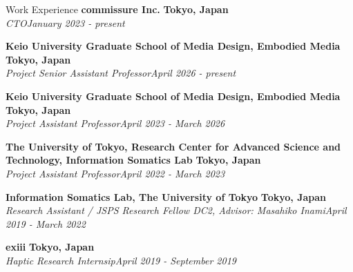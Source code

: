 \documentclass{resume} %
\begin{document}
\begin{rSection}{Work Experience}
{\bf commissure Inc.} \hfill {\bf Tokyo, Japan} 
\\{\em CTO}\hfill {\em January 2023 - present} 

{\bf Keio University Graduate School of Media Design, Embodied Media} \hfill {\bf Tokyo, Japan} 
\\{\em Project Senior Assistant Professor}\hfill {\em April 2026 - present} 

{\bf Keio University Graduate School of Media Design, Embodied Media} \hfill {\bf Tokyo, Japan} 
\\{\em Project Assistant Professor}\hfill {\em April 2023 - March 2026} 

{\bf The University of Tokyo, Research Center for Advanced Science and Technology, Information Somatics Lab} \hfill {\bf Tokyo, Japan} 
\\{\em Project Assistant Professor}\hfill {\em April 2022 - March 2023} 

{\bf Information Somatics Lab, The University of Tokyo} \hfill {\bf Tokyo, Japan} 
\\{\em  Research Assistant / JSPS Research Fellow DC2, Advisor: Masahiko Inami}\hfill {\em April 2019 - March 2022} 

{\bf exiii } \hfill {\bf Tokyo, Japan} 
\\{\em Haptic Research Internsip}\hfill  {\em April 2019 - September 2019} 


\end{rSection}
\end{document}
